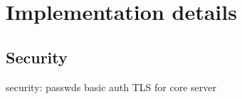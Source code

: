 \setlength{\parindent}{0pt}
\setlength{\parskip}{0.6em}

\chapter[Implementation]{Implementation details}
\label{chap:implementation}







\section{Security}
security:
    passwds
        basic auth
    TLS for core server 


